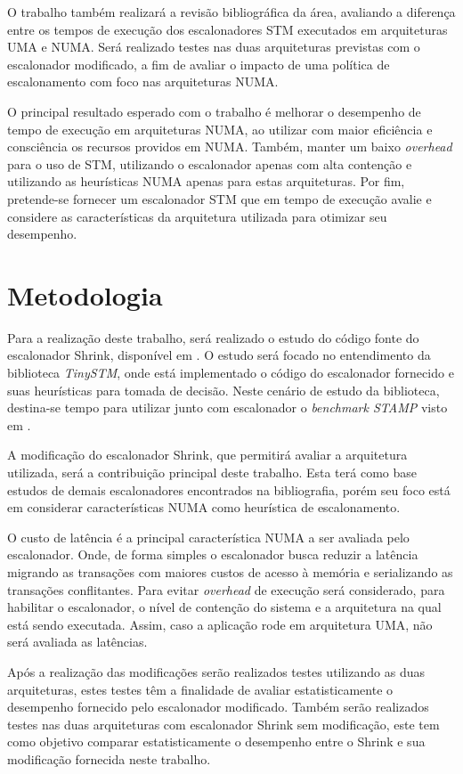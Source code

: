 \documentclass[diss-proposta,nocipinfo]{texufpel}
\begin{document}
O trabalho também realizará a revisão bibliográfica da área, avaliando a diferença entre os tempos de execução dos escalonadores STM executados em arquiteturas UMA e NUMA. Será realizado testes nas duas arquiteturas previstas com o escalonador modificado, a fim de avaliar o impacto de uma política de escalonamento com foco nas arquiteturas NUMA.

O principal resultado esperado com o trabalho é melhorar o desempenho de tempo de execução em arquiteturas NUMA, ao utilizar com maior eficiência e consciência os recursos providos em NUMA. Também, manter um baixo \emph{overhead} para o uso de STM, utilizando o escalonador apenas com alta contenção e utilizando as heurísticas NUMA apenas para estas arquiteturas. Por fim, pretende-se fornecer um escalonador STM que em tempo de execução avalie e considere as características da arquitetura utilizada para otimizar seu desempenho.

\chapter{Metodologia}

Para a realização deste trabalho, será realizado o estudo do código fonte do escalonador Shrink, disponível em \cite{shrink09}. O estudo será focado no entendimento da biblioteca \emph{TinySTM}, onde está implementado o código do escalonador fornecido e suas heurísticas para tomada de decisão. Neste cenário de estudo da biblioteca, destina-se tempo para utilizar junto com escalonador o \emph{benchmark STAMP} visto em \cite{STAMP}.

A modificação do escalonador Shrink, que permitirá avaliar a arquitetura utilizada, será a contribuição principal deste trabalho. Esta terá como base estudos de demais escalonadores encontrados na bibliografia, porém seu foco está em considerar características NUMA como heurística de escalonamento.

O custo de latência é a principal característica NUMA a ser avaliada pelo escalonador. Onde, de forma simples o escalonador busca reduzir a latência migrando as transações com maiores custos de acesso à memória e serializando as transações conflitantes. Para evitar \emph{overhead} de execução será considerado, para habilitar o escalonador, o nível de contenção do sistema e a arquitetura na qual está sendo executada. Assim, caso a aplicação rode em arquitetura UMA, não será avaliada as latências.

Após a realização das modificações serão realizados testes utilizando as duas arquiteturas, estes testes têm a finalidade de avaliar estatisticamente o desempenho fornecido pelo escalonador modificado. Também serão realizados testes nas duas arquiteturas com escalonador Shrink sem modificação, este tem como objetivo comparar estatisticamente o desempenho entre o Shrink e sua modificação fornecida neste trabalho.
\end{document}

